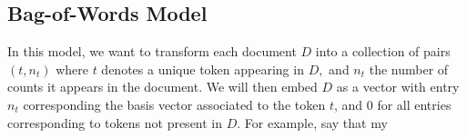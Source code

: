 \documentclass[a4paper,12pt]{article}
\newcommand{\3}{\left}
\newcommand{\4}{\right}
\renewcommand{\-}[1]{{}^{-#1}}
\begin{document}
\subsection*{Bag-of-Words Model}

In this model, we want to transform each document $D$ into a collection of pairs $(t, n_t)$ where $t$ denotes a unique token appearing in $D,$ and $n_t$ the number of counts it appears in the document. We will then embed $D$ as a vector with entry $n_t$ corresponding the basis vector associated to the token $t$, and 0 for all entries corresponding to tokens not present in $D.$ For example, say that my 
\end{document}
